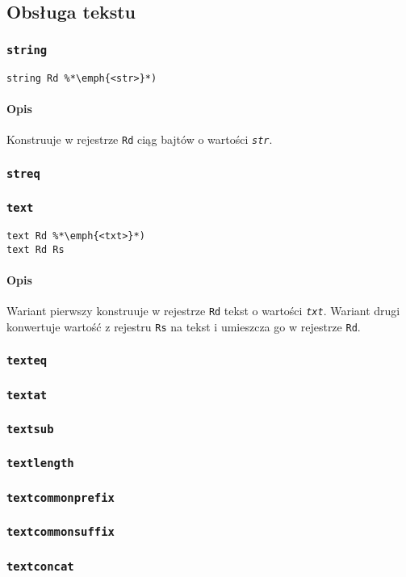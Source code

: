 \subsection{Obsługa tekstu}
\label{viua_vm_ops_text}

\subsubsection{\texttt{string}}

\begin{lstlisting}
string Rd %*\emph{<str>}*)
\end{lstlisting}

\paragraph*{Opis} Konstruuje w rejestrze \texttt{Rd} ciąg bajtów o wartości \emph{\texttt{str}}.

\subsubsection{\texttt{streq}}

\subsubsection{\texttt{text}}

\begin{lstlisting}
text Rd %*\emph{<txt>}*)
text Rd Rs
\end{lstlisting}

\paragraph*{Opis} Wariant pierwszy konstruuje w rejestrze \texttt{Rd} tekst o wartości \emph{\texttt{txt}}.
Wariant drugi konwertuje wartość z rejestru \texttt{Rs} na tekst i umieszcza go w rejestrze \texttt{Rd}.

\subsubsection{\texttt{texteq}}
\subsubsection{\texttt{textat}}
\subsubsection{\texttt{textsub}}
\subsubsection{\texttt{textlength}}
\subsubsection{\texttt{textcommonprefix}}
\subsubsection{\texttt{textcommonsuffix}}
\subsubsection{\texttt{textconcat}}
